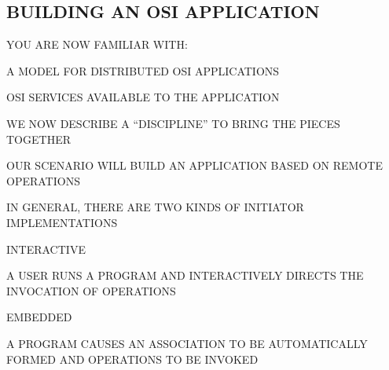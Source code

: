 \begin{bwslide}
\part	{BUILDING AN OSI APPLICATION}\bf

\begin{nrtc}
\item	YOU ARE NOW FAMILIAR WITH:
    \begin{nrtc}
    \item	A MODEL FOR DISTRIBUTED OSI APPLICATIONS

    \item	OSI SERVICES AVAILABLE TO THE APPLICATION
    \end{nrtc}

\item	WE NOW DESCRIBE A ``DISCIPLINE'' TO BRING THE PIECES TOGETHER
\item	OUR SCENARIO WILL BUILD AN APPLICATION BASED ON REMOTE OPERATIONS
\end{nrtc}
\end{bwslide}


\begin{bwslide}

\begin{nrtc}
\item	IN GENERAL, THERE ARE TWO KINDS OF INITIATOR IMPLEMENTATIONS

\item	INTERACTIVE
    \begin{nrtc}
    \item	A USER RUNS A PROGRAM AND INTERACTIVELY DIRECTS THE
		INVOCATION OF OPERATIONS
    \end{nrtc}

\item	EMBEDDED
    \begin{nrtc}
    \item	A PROGRAM CAUSES AN ASSOCIATION TO BE AUTOMATICALLY FORMED
		AND OPERATIONS TO BE INVOKED
    \end{nrtc}
\end{nrtc}
\end{bwslide}


